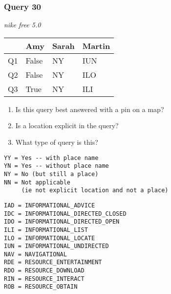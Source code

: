 \begin{frame}[fragile]
\frametitle{Query 30}
\vspace{1em}

\emph{nike free 5.0}

\vfill

\begin{table}
  \centering
  \begin{tabular}{ l l l l }
    & \textbf{Amy} & \textbf{Sarah} & \textbf{Martin}\\
    \toprule
    Q1 & False & NY & IUN\\
Q2 & False & NY & ILO\\
Q3 & True & NY & ILI\\
    \bottomrule
  \end{tabular}
\end{table}

\vfill

\tiny{

\begin{enumerate}
\item Is this query best answered with a pin on a map?
\item Is a location explicit in the query?
\item What type of query is this?
\end{enumerate}

\vfill

\begin{multicols}{2}
\begin{verbatim}
YY = Yes -- with place name
YN = Yes -- without place name
NY = No (but still a place)
NN = Not applicable 
     (ie not explicit location and not a place)
\end{verbatim}

\columnbreak
\begin{verbatim}
IAD = INFORMATIONAL_ADVICE
IDC = INFORMATIONAL_DIRECTED_CLOSED
IDO = INFORMATIONAL_DIRECTED_OPEN
ILI = INFORMATIONAL_LIST
ILO = INFORMATIONAL_LOCATE
IUN = INFORMATIONAL_UNDIRECTED
NAV = NAVIGATIONAL
RDE = RESOURCE_ENTERTAINMENT
RDO = RESOURCE_DOWNLOAD
RIN = RESOURCE_INTERACT
ROB = RESOURCE_OBTAIN
\end{verbatim}
\end{multicols}
}

\end{frame}


